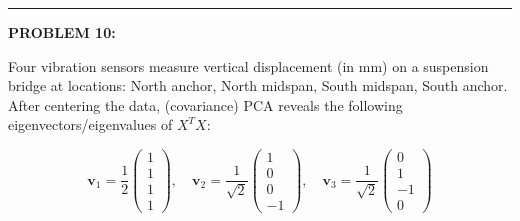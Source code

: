 \documentclass[12pt]{amsart}
\newcommand{\divider}{
  \vspace{-1em} %
  \noindent
  \raisebox{-0.15ex}{\textbullet}%
  \hspace{0.5em}%
  \rule[0.5ex]{0.95\textwidth}{1.0pt}%
  \hspace{0.5em}%
  \raisebox{-0.15ex}{\textbullet}%
  \vspace{0em} %
}
\begin{document}

\divider

\newpage


{\bf PROBLEM 10:}

Four vibration sensors measure vertical displacement (in mm) on a suspension bridge at locations: North anchor, North midspan, South midspan, South anchor. After centering the data, (covariance) PCA reveals the following eigenvectors/eigenvalues of $X^TX$:

$$\mathbf{v}_1 = \frac{1}{2}\begin{pmatrix} 1 \\ 1 \\ 1 \\ 1 \end{pmatrix}, \quad \mathbf{v}_2 = \frac{1}{\sqrt{2}}\begin{pmatrix} 1 \\ 0 \\ 0 \\ -1 \end{pmatrix}, \quad \mathbf{v}_3 = \frac{1}{\sqrt{2}}\begin{pmatrix} 0 \\ 1 \\ -1 \\ 0 \end{pmatrix}$$
\end{document}
